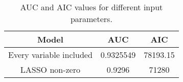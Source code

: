     \begin{table}[H]
        \centering
            \begin{tabular}{c|c|c}
            Model & AUC & AIC \\\hline
            Every variable included & 0.9325549 & 78193.15\\
            LASSO non-zero &  0.9296 & 71280\\
            
		    \end{tabular}
            \caption{AUC and AIC values for different input parameters.}
	        \label{ModelAICandAUC}
        \end{table}
        \noindent